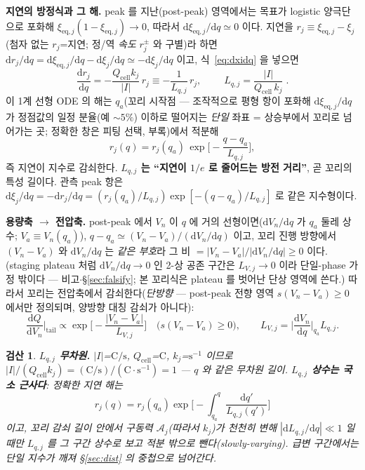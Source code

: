\documentclass[11pt,a4paper]{article}
\newtheorem*{verifybox}{검산}
\newcommand{\dd}{\mathrm{d}}
\newcommand{\eq}{\mathrm{eq}}
\newcommand{\cell}{\mathrm{cell}}
\begin{document}
\textbf{지연의 방정식과 그 해.} peak 를 지난(post-peak) 영역에서는 목표가 logistic 양극단으로 포화해
$\xi_{\eq,j}(1-\xi_{\eq,j})\to0$, 따라서 $\dd\xi_{\eq,j}/\dd q\simeq0$ 이다. 지연을 $r_j\equiv\xi_{\eq,j}-\xi_j$
(첨자 없는 $r_j$=지연; 정/역 \emph{속도} $r_j^\pm$ 와 구별)라 하면 $\dd r_j/\dd q=\dd\xi_{\eq,j}/\dd q-\dd\xi_j/\dd q\simeq-\dd\xi_j/\dd q$ 이고, 식~\eqref{eq:dxidq} 을
넣으면
\begin{equation}
\frac{\dd r_j}{\dd q}=-\frac{Q_\cell k_j}{|I|}\,r_j\equiv-\frac{1}{L_{q,j}}\,r_j,\qquad
\boxed{\;L_{q,j}=\frac{|I|}{Q_\cell\,k_j}\;}.
\label{eq:Lq}
\end{equation}
이 1계 선형 ODE 의 해는 $q_a$(꼬리 시작점 — 조작적으로 평형 항이 포화해 $\dd\xi_{\eq,j}/\dd q$ 가 정점값의 일정
분율(예 $\sim5\%$) 이하로 떨어지는 \emph{단일} 좌표 = 상승부에서 꼬리로 넘어가는 곳; 정확한 창은 피팅 선택, 부록)에서 적분해
\begin{equation}
r_j(q)=r_j(q_a)\,\exp\!\Big[-\frac{q-q_a}{L_{q,j}}\Big],
\label{eq:rsol}
\end{equation}
즉 지연이 지수로 감쇠한다. \textbf{$L_{q,j}$ 는 ``지연이 $1/e$ 로 줄어드는 방전 거리''}, 곧 꼬리의 특성 길이다.
관측 peak 항은 $\dd\xi_j/\dd q=-\dd r_j/\dd q=(r_j(q_a)/L_{q,j})\exp[-(q-q_a)/L_{q,j}]$ 로 같은 지수형이다.

\textbf{용량축 $\to$ 전압축.} post-peak 에서 $V_n$ 이 $q$ 에 거의 선형이면($\dd V_n/\dd q$ 가 $q_a$ 둘레 상수;
$V_a\equiv V_n(q_a)$), $q-q_a\simeq(V_n-V_a)/(\dd V_n/\dd q)$ 이고, 꼬리 진행 방향에서 $(V_n-V_a)$ 와 $\dd V_n/\dd q$
는 \emph{같은 부호}라 그 비 $=|V_n-V_a|/|\dd V_n/\dd q|\ge0$ 이다. (staging plateau 처럼 $\dd V_n/\dd q\to0$ 인 2-상
공존 구간은 $L_{V,j}\to0$ 이라 단일-phase 가정 밖이다 — 비고$\cdot$\S\ref{sec:falsify}; 본 꼬리식은 plateau 를
벗어난 단상 영역에 쓴다.) 따라서 꼬리는 전압축에서 감쇠한다(\emph{단방향}
— post-peak 전향 영역 $s(V_n-V_a)\ge0$ 에서만 정의되며, 양방향 대칭 감쇠가 아니다):
\begin{equation}
\frac{\dd Q}{\dd V_n}\Big|_{\text{tail}}\propto\exp\!\Big[-\frac{|V_n-V_a|}{L_{V,j}}\Big]\quad\big(s(V_n-V_a)\ge0\big),\qquad
L_{V,j}=\Big|\frac{\dd V_n}{\dd q}\Big|_{q_a}L_{q,j}.
\label{eq:tail}
\end{equation}

\begin{verifybox}
\textbf{$L_{q,j}$ 무차원.} $|I|$=$\mathrm{C/s}$, $Q_\cell$=$\mathrm C$, $k_j$=$\mathrm{s^{-1}}$ 이므로
$|I|/(Q_\cell k_j)=(\mathrm{C/s})/(\mathrm C\cdot\mathrm{s^{-1}})=1$ — $q$ 와 같은 무차원 길이. \textbf{$L_{q,j}$ 상수는
\emph{국소 근사}다}: 정확한 지연 해는
\[ r_j(q)=r_j(q_a)\exp\!\Big[-\int_{q_a}^q\frac{\dd q'}{L_{q,j}(q')}\Big] \]
이고, 꼬리 감쇠 길이 안에서 구동력 $\mathcal A_j$(따라서 $k_j$)가 천천히 변해 $|\dd L_{q,j}/\dd q|\ll1$ 일 때만 $L_{q,j}$ 를
그 구간 상수로 보고 적분 밖으로 뺀다(slowly-varying). 급변 구간에서는 단일 지수가 깨져 \S\ref{sec:dist} 의 중첩으로 넘어간다.
\end{verifybox}
\end{document}
